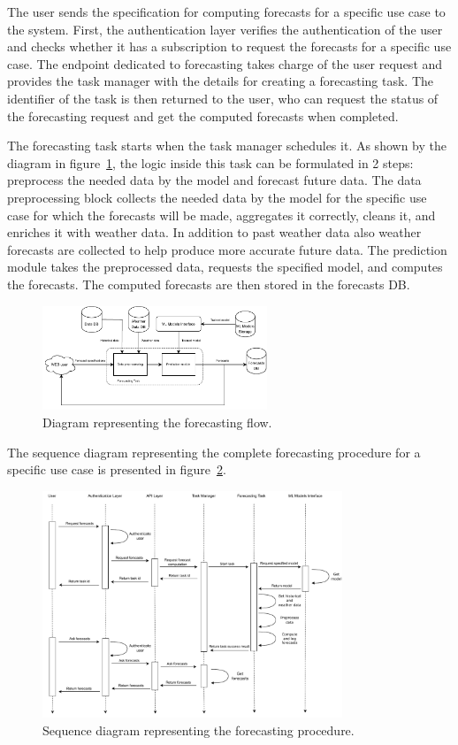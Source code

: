 The user sends the specification for computing forecasts for a specific use case to the system.
First, the authentication layer verifies the authentication of the user and checks whether it has a subscription to request the forecasts for a specific use case.
The endpoint dedicated to forecasting takes charge of the user request and provides the task manager with the details for creating a forecasting task.
The identifier of the task is then returned to the user, who can request the status of the forecasting request and get the computed forecasts when completed.

The forecasting task starts when the task manager schedules it.
As shown by the diagram in figure~\ref{fig:forecastflow}, the logic inside this task can be formulated in 2 steps: preprocess the needed data by the model and forecast future data.
The data preprocessing block collects the needed data by the model for the specific use case for which the forecasts will be made, aggregates it correctly, cleans it, and enriches it with weather data. In addition to past weather data also weather forecasts are collected to help produce more accurate future data.
The prediction module takes the preprocessed data, requests the specified model, and computes the forecasts.
The computed forecasts are then stored in the forecasts DB.

\begin{figure}[H]
\centering
\includegraphics[width=0.6\textwidth]{images/architecture_forecasting_flow}
\caption{Diagram representing the forecasting flow.}
\label{fig:forecastflow}
\end{figure}

The sequence diagram representing the complete forecasting procedure for a specific use case is presented in figure~\ref{fig:forecastingsequence}.

\begin{figure}[H]
\centering
\includegraphics[width=0.8\textwidth]{images/architecture_forecasting_sequence}
\caption{Sequence diagram representing the forecasting procedure.}
\label{fig:forecastingsequence}
\end{figure}


